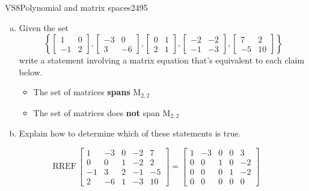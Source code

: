 \begin{exercise}{VS8}{Polynomial and matrix spaces}{2495} 
\begin{exerciseStatement} 

\begin{enumerate}[(a)]
\item  

 Given the set \[\left\{ \left[\begin{array}{cc}
1 & 0 \\
-1 & 2
\end{array}\right] , \left[\begin{array}{cc}
-3 & 0 \\
3 & -6
\end{array}\right] , \left[\begin{array}{cc}
0 & 1 \\
2 & 1
\end{array}\right] , \left[\begin{array}{cc}
-2 & -2 \\
-1 & -3
\end{array}\right] , \left[\begin{array}{cc}
7 & 2 \\
-5 & 10
\end{array}\right] \right\}\] write a statement involving a matrix equation that's equivalent to each claim below. 

 

\begin{itemize}
\item  

 The set of matrices \textbf{spans} \(\mathrm{M}_{2,2}\) 

 
\item  

 The set of matrices does \textbf{not} span \(\mathrm{M}_{2,2}\) 

 
\end{itemize}

     
\item  

 Explain how to determine which of these statements is true. 

 
\end{enumerate}

     \end{exerciseStatement}
 \begin{exerciseAnswer} 

 \[
\mathrm{RREF}\, \left[\begin{array}{ccccc}
1 & -3 & 0 & -2 & 7 \\
0 & 0 & 1 & -2 & 2 \\
-1 & 3 & 2 & -1 & -5 \\
2 & -6 & 1 & -3 & 10
\end{array}\right] = \left[\begin{array}{ccccc}
1 & -3 & 0 & 0 & 3 \\
0 & 0 & 1 & 0 & -2 \\
0 & 0 & 0 & 1 & -2 \\
0 & 0 & 0 & 0 & 0
\end{array}\right]
            \] 


\end{exerciseAnswer}
\end{exercise}
